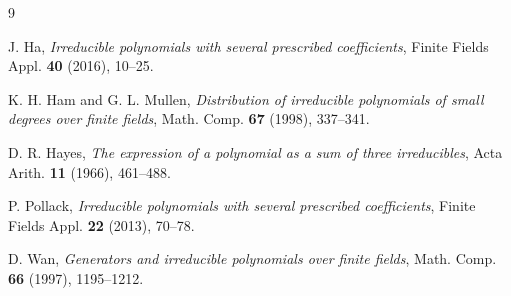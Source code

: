 \documentclass[11pt,a4paper]{amsart}
\theoremstyle{remark}
\numberwithin{equation}{section}
\begin{document}
\begin{thebibliography}{9}

 J. Ha, \emph{Irreducible polynomials with several prescribed coefficients}, Finite Fields Appl.
\textbf{40} (2016), 10--25.

 K. H. Ham and G. L. Mullen, \emph{Distribution of irreducible polynomials of small degrees over
finite fields}, Math. Comp. \textbf{67} (1998), 337--341.

 D. R. Hayes, \emph{The expression of a polynomial as a sum of three irreducibles}, Acta Arith.
\textbf{11} (1966), 461--488.

 P. Pollack, \emph{Irreducible polynomials with several prescribed coefficients}, Finite Fields
Appl. \textbf{22} (2013), 70--78.

 D. Wan, \emph{Generators and irreducible polynomials over finite fields}, Math. Comp. \textbf{66}
(1997), 1195--1212.

\end{thebibliography}
\end{document}
